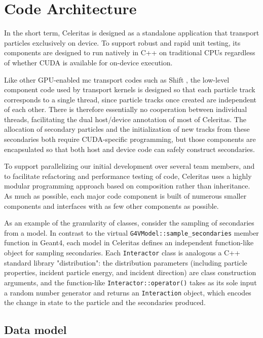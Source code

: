\hypertarget{code-architecture}{%
\section{Code Architecture}\label{code-architecture}}

In the short term, Celeritas is designed as a standalone application
that transport particles exclusively on device. To support robust and
rapid unit testing, its components are designed to run natively in C++
on traditional CPUs regardless of whether CUDA is available for
on-device execution.

Like other GPU-enabled \ac{mc} transport codes such as
Shift \cite{pandya_implementation_2016,hamilton_continuous-energy_2019},
the low-level component code used by transport kernels is designed so
that each particle track corresponds to a single thread, since particle
tracks once created are independent of each other. There is therefore
essentially no cooperation between individual threads, facilitating the
dual host/device annotation of most of Celeritas. The allocation of
secondary particles and the initialization of new tracks from these
secondaries both require CUDA-specific programming, but those components
are encapsulated so that both host and device code can safely construct
secondaries.

To support parallelizing our initial development over several team
members, and to facilitate refactoring and performance testing of code,
Celeritas uses a highly modular programming approach based on
composition rather than inheritance. As much as possible, each major
code component is built of numerous smaller components and interfaces
with as few other components as possible.

As an example of the granularity of classes, consider the sampling of
secondaries from a model. In contrast to the virtual
\texttt{G4VModel::sample\_secondaries} member function in Geant4, each
model in Celeritas defines an independent function-like object for
sampling secondaries. Each \texttt{Interactor} class is analogous a C++
standard library "distribution": the distribution parameters (including
particle properties, incident particle energy, and incident direction)
are class construction arguments, and the function-like
\texttt{Interactor::operator()} takes as its sole input a random number
generator and returns an \texttt{Interaction} object, which encodes the
change in state to the particle and the secondaries produced.

\hypertarget{data-model}{%
\subsection{Data model}\label{data-model}}

